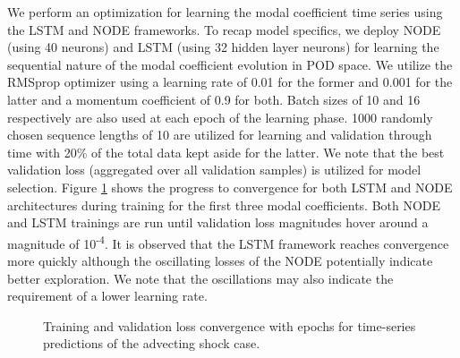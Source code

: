 \documentclass[preprint,12pt]{elsarticle}
\begin{document}
We perform an optimization for learning the modal coefficient time series using the LSTM and NODE frameworks. To recap model specifics, we deploy NODE (using 40 neurons) and LSTM (using 32 hidden layer neurons) for learning the sequential nature of the modal coefficient evolution in POD space. We utilize the RMSprop optimizer using a learning rate of 0.01 for the former and 0.001 for the latter and a momentum coefficient of 0.9 for both. Batch sizes of 10 and 16 respectively are also used at each epoch of the learning phase. 1000 randomly chosen sequence lengths of 10 are utilized for learning and validation through time with 20\% of the total data kept aside for the latter. We note that the best validation loss (aggregated over all validation samples) is utilized for model selection. Figure \ref{Figure2} shows the progress to convergence for both LSTM and NODE architectures during training for the first three modal coefficients. Both NODE and LSTM trainings are run until validation loss magnitudes hover around a magnitude of 10\textsuperscript{-4}. It is observed that the LSTM framework reaches convergence more quickly although the oscillating losses of the NODE potentially indicate better exploration. We note that the oscillations may also indicate the requirement of a lower learning rate.

\begin{figure}
	\centering
	\caption{Training and validation loss convergence with epochs for time-series predictions of the advecting shock case.}
	\label{Figure2}
\end{figure}
\end{document}
